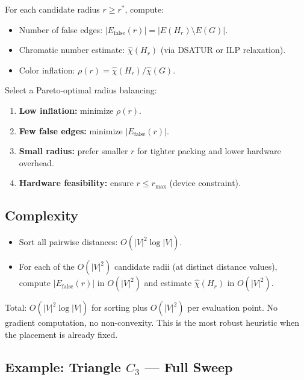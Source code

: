 \documentclass[11pt]{article}
\newcommand{\Efalse}{E_{\mathrm{false}}}
\newcommand{\chihat}{\widehat{\chi}}
\begin{document}
For each candidate radius $r \geq r^*$, compute:
\begin{itemize}
  \item Number of false edges: $|\Efalse(r)| = |E(H_r) \setminus E(G)|$.
  \item Chromatic number estimate: $\chihat(H_r)$ (via DSATUR or ILP relaxation).
  \item Color inflation: $\rho(r) = \chihat(H_r) / \chihat(G)$.
\end{itemize}

Select a Pareto-optimal radius balancing:
\begin{enumerate}
  \item \textbf{Low inflation:} minimize $\rho(r)$.
  \item \textbf{Few false edges:} minimize $|\Efalse(r)|$.
  \item \textbf{Small radius:} prefer smaller $r$ for tighter packing and lower
    hardware overhead.
  \item \textbf{Hardware feasibility:} ensure $r \leq r_{\max}$ (device constraint).
\end{enumerate}

\subsection{Complexity}

\begin{itemize}
  \item Sort all pairwise distances: $O(|V|^2 \log |V|)$.
  \item For each of the $O(|V|^2)$ candidate radii (at distinct distance
    values), compute $|\Efalse(r)|$ in $O(|V|^2)$ and estimate $\chihat(H_r)$
    in $O(|V|^2)$.
\end{itemize}
Total: $O(|V|^2 \log |V|)$ for sorting plus $O(|V|^2)$ per evaluation point.
No gradient computation, no non-convexity. This is the most robust heuristic
when the placement is already fixed.

\subsection{Example: Triangle $C_3$ — Full Sweep}
\end{document}
